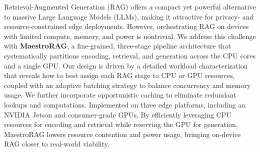 Retrieval-Augmented Generation (RAG) offers a compact yet powerful alternative to massive Large Language Models (LLMs), making it attractive for privacy- and resource-constrained edge deployments. However, orchestrating RAG on devices with limited compute, memory, and power is nontrivial. We address this challenge with \textbf{MaestroRAG}, a fine-grained, three-stage pipeline architecture that systematically partitions encoding, retrieval, and generation across the CPU cores and a single GPU. Our design is driven by a detailed workload characterization that reveals how to best assign each RAG stage to CPU or GPU resources, coupled with an adaptive batching strategy to balance concurrency and memory usage. We further incorporate opportunistic caching to eliminate redundant lookups and computations. Implemented on three edge platforms, including an NVIDIA Jetson and consumer-grade GPUs,  By efficiently leveraging CPU resources for encoding and retrieval while reserving the GPU for generation, MaestroRAG lowers resource contention and power usage, bringing on-device RAG closer to real-world viability.